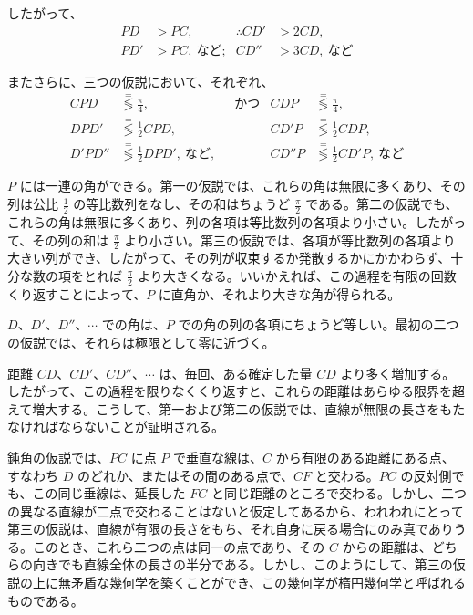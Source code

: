 したがって、
\begin{align*}
  PD  &> PC,               &\therefore CD' &> 2CD,\\
  PD' &> PC,\ \text{など;} &          CD'' &> 3CD,\ \text{など}
\end{align*}

またさらに、三つの仮説において、それぞれ、
\begin{align*}
  CPD    &\stackrel{=}{\lessgtr} \frac{\pi}{4}, &&\text{かつ}&
                         CDP &\stackrel{=}{\lessgtr} \frac{\pi}{4},\\
  DPD'   &\stackrel{=}{\lessgtr} \tfrac{1}{2} CPD, &&&
                    CD'P  &\stackrel{=}{\lessgtr} \tfrac{1}{2} CDP,\\
  D'PD'' &\stackrel{=}{\lessgtr} \tfrac{1}{2} DPD',\ \text{など,} &&&
        CD''P &\stackrel{=}{\lessgtr} \tfrac{1}{2} CD'P,\ \text{など}
\end{align*}

$P$ には一連の角ができる。第一の仮説では、これらの角は無限に多くあり、その列は公比 $\frac{1}{2}$ の等比数列をなし、その和はちょうど $\frac{\pi}{2}$ である。第二の仮説でも、これらの角は無限に多くあり、列の各項は等比数列の各項より小さい。したがって、その列の和は $\frac{\pi}{2}$ より小さい。第三の仮説では、各項が等比数列の各項より大きい列ができ、したがって、その列が収束するか発散するかにかかわらず、十分な数の項をとれば $\frac{\pi}{2}$ より大きくなる。いいかえれば、この過程を有限の回数くり返すことによって、$P$ に直角か、それより大きな角が得られる。

$D$、$D'$、$D''$、$\cdots$ での角は、$P$ での角の列の各項にちょうど等しい。最初の二つの仮説では、それらは極限として零に近づく。

距離 $CD$、$CD'$、$CD''$、$\cdots$ は、毎回、ある確定した量 $CD$ より多く増加する。したがって、この過程を限りなくくり返すと、これらの距離はあらゆる限界を超えて増大する。こうして、第一および第二の仮説では、直線が無限の長さをもたなければならないことが証明される。

鈍角の仮説では、$PC$ に点 $P$ で垂直な線は、$C$ から有限のある距離にある点、すなわち $D$ のどれか、またはその間のある点で、$CF$ と交わる。$PC$ の反対側でも、この同じ垂線は、延長した $FC$ と同じ距離のところで交わる。しかし、二つの異なる直線が二点で交わることはないと仮定してあるから、われわれにとって第三の仮説は、直線が有限の長さをもち、それ自身に戻る場合にのみ真でありうる。このとき、これら二つの点は同一の点であり、その $C$ からの距離は、どちらの向きでも直線全体の長さの半分である。しかし、このようにして、第三の仮説の上に無矛盾な幾何学を築くことができ、この幾何学が楕円幾何学と呼ばれるものである。

